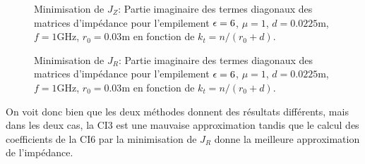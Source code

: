   \begin{figure}[!hbt]
    \centering
    
    \caption[Partie imaginaire de l'opérateur de Calderón, compararé avec les approximations CI0, CI3, CI6 (calculées avec Jz) pour une couche cylindrique de matériau de Hoppe \& Rahmat-Samii.]{Minimisation de \(J_Z\): Partie imaginaire des termes diagonaux des matrices d'impédance pour l'empilement \(\epsilon = 6\), \(\mu = 1\), \(d=0.0225\)m, \(f=1\)GHz, \(r_0=0.03\)m en fonction de \(k_t = n / (r_0+d)\).}
    \label{fig:imp_fourier:cylindre:hoppe:62:hoibc:mode_2}
  \end{figure}

  \begin{figure}[!hbt]
    \centering
    
    \caption[Partie imaginaire de l'opérateur de Calderón, compararé avec les approximations CI0, CI3, CI6 (calculées avec Jr)  pour une couche cylindrique de matériau de Hoppe \& Rahmat-Samii.]{Minimisation de \(J_R\): Partie imaginaire des termes diagonaux des matrices d'impédance pour l'empilement \(\epsilon = 6\), \(\mu = 1\), \(d=0.0225\)m, \(f=1\)GHz, \(r_0=0.03\)m en fonction de \(k_t = n / (r_0+d)\).}
    \label{fig:imp_fourier:cylindre:hoppe:62:hoibc:mode_1}
  \end{figure}

  \FloatBarrier

  On voit donc bien que les deux méthodes donnent des résultats différents, mais dans les deux cas, la CI3 est une mauvaise approximation tandis que le calcul des coefficients de la CI6 par la minimisation de \(J_R\) donne la meilleure approximation de l'impédance.

